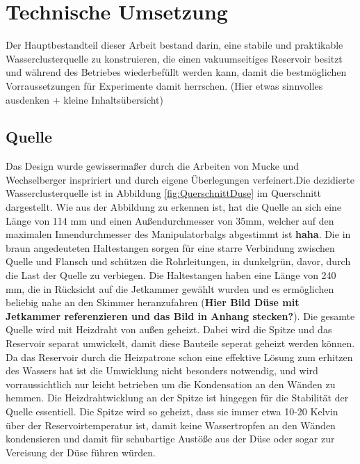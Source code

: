 \chapter{Technische Umsetzung} 

Der Hauptbestandteil dieser Arbeit bestand darin, eine stabile und praktikable Wasserclusterquelle zu konstruieren, die einen vakuumseitiges Reservoir besitzt und während des Betriebes wiederbefüllt werden kann, damit die bestmöglichen Vorraussetzungen für Experimente damit herrschen. (Hier etwas sinnvolles ausdenken + kleine Inhaltsübersicht)

\section{Quelle} \label{sec:Quelle}

Das Design wurde gewissermaßer durch die Arbeiten von Mucke \cite{mucke2011} und Wechselberger \cite{wechselberger2014} inspririert und durch eigene Überlegungen verfeinert.Die dezidierte Wasserclusterquelle ist in Abbildung \ref{fig:QuerschnittDuse} im Querschnitt dargestellt. Wie aus der Abbildung zu erkennen ist, hat die Quelle an sich eine Länge von 114 mm und einen Außendurchmesser von 35mm, welcher auf den maximalen Innendurchmesser des Manipulatorbalgs abgestimmt ist \textbf{haha}. Die in braun angedeuteten Haltestangen sorgen für eine starre Verbindung zwischen Quelle und Flansch und schützen die Rohrleitungen, in dunkelgrün, davor, durch die Last der Quelle zu verbiegen. Die Haltestangen haben eine Länge von 240 mm, die in Rücksicht auf die Jetkammer gewählt wurden und es ermöglichen beliebig nahe an den Skimmer heranzufahren (\textbf{Hier Bild Düse mit Jetkammer referenzieren und das Bild in Anhang stecken?}). Die gesamte Quelle wird mit Heizdraht von außen geheizt. Dabei wird die Spitze und das Reservoir separat umwickelt, damit diese Bauteile seperat geheizt werden können. Da das Reservoir durch die Heizpatrone schon eine effektive Lösung zum erhitzen des Wassers hat ist die Umwicklung nicht besonders notwendig, und wird vorraussichtlich nur leicht betrieben um die Kondensation an den Wänden zu hemmen. Die Heizdrahtwicklung an der Spitze ist hingegen für die Stabilität der Quelle essentiell. Die Spitze wird so geheizt, dass sie immer etwa 10-20 Kelvin über der Reservoirtemperatur ist, damit keine Wassertropfen an den Wänden kondensieren und damit für schubartige Austöße aus der Düse oder sogar zur Vereisung der Düse führen würden.

